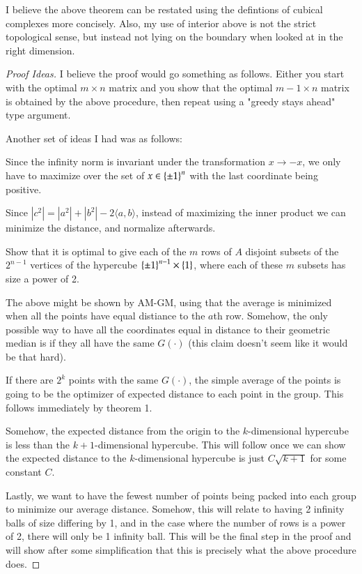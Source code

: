 \documentclass[12pt]{article}
\theoremstyle{definitionstyle}
\renewcommand{\ip}[1]{\langle#1\rangle}
\newcommand{\SET}[1]{\Set{\mskip-\medmuskip #1 \mskip-\medmuskip}}
\begin{document}
    I believe the above theorem can be restated using the defintions of cubical complexes more concisely. Also, my use of interior above is not the strict topological sense, but instead not lying on the boundary when looked at in the right dimension.

    \begin{proof}[Proof Ideas]
        I believe the proof would go something as follows. Either you start with the optimal $m \times n$ matrix and you show that the optimal $m-1 \times n$ matrix is obtained by the above procedure, then repeat using a "greedy stays ahead" type argument. 

        Another set of ideas I had was as follows:

        Since the infinity norm is invariant under the transformation $x \to -x$, we only have to maximize over the set of $x \in \SET{\pm 1}^n$ with the last coordinate being positive.

        Since $|c^2| = |a^2|+|b^2| - 2\ip{a,b}$, instead of maximizing the inner product we can minimize the distance, and normalize afterwards.

        Show that it is optimal to give each of the $m$ rows of $A$ disjoint subsets of the $2^{n-1}$ vertices of the hypercube $\SET{\pm 1}^{n-1} \times \SET{1}$, where each of these $m$ subsets has size a power of 2.

        The above might be shown by AM-GM, using that the average is minimized when all the points have equal distiance to the $a$th row. Somehow, the only possible way to have all the coordinates equal in distance to their geometric median is if they all have the same $G(\cdot)$ (this claim doesn't seem like it would be that hard).

        If there are $2^k$ points with the same $G(\cdot)$, the simple average of the points is going to be the optimizer of expected distance to each point in the group. This follows immediately by theorem 1.

        Somehow, the expected distance from the origin to the $k$-dimensional hypercube is less than the $k+1$-dimensional hypercube. This will follow once we can show the expected distance to the $k$-dimensional hypercube is just $C\sqrt{k+1}$ for some constant $C$.

        Lastly, we want to have the fewest number of points being packed into each group to minimize our average distance. Somehow, this will relate to having 2 infinity balls of size differing by 1, and in the case where the number of rows is a power of 2, there will only be 1 infinity ball. This will be the final step in the proof and will show after some simplification that this is precisely what the above procedure does.
    \end{proof}
\end{document}
